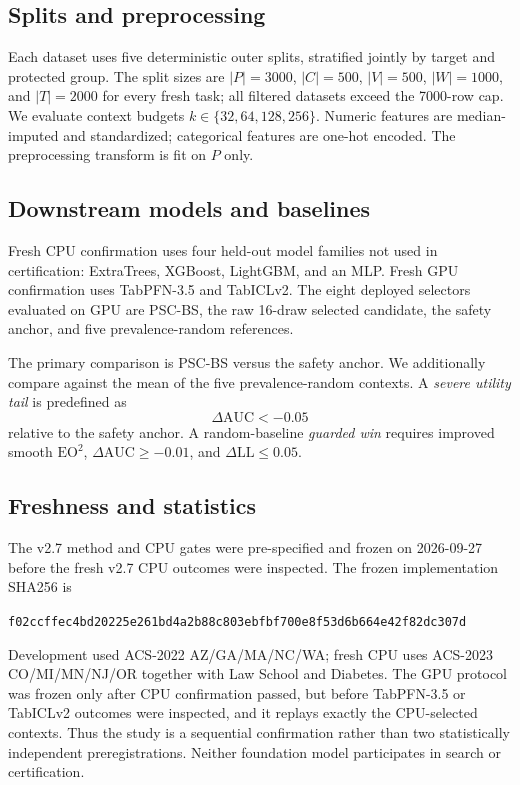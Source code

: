\documentclass[10pt]{article}
\newcommand{\PSC}{\textsc{PSC-BS}}
\newcommand{\eo}{\mathrm{EO}^2}
\newcommand{\AUC}{\mathrm{AUC}}
\newcommand{\LL}{\mathrm{LL}}
\begin{document}
\subsection{Splits and preprocessing}

Each dataset uses five deterministic outer splits, stratified jointly by target and protected group.
The split sizes are $|P|=3000$, $|C|=500$, $|V|=500$, $|W|=1000$, and $|T|=2000$ for every fresh task; all filtered datasets exceed the 7000-row cap.
We evaluate context budgets $k\in\{32,64,128,256\}$.
Numeric features are median-imputed and standardized; categorical features are one-hot encoded.
The preprocessing transform is fit on $P$ only.

\subsection{Downstream models and baselines}

Fresh CPU confirmation uses four held-out model families not used in certification: ExtraTrees, XGBoost, LightGBM, and an MLP.
Fresh GPU confirmation uses TabPFN-3.5 and TabICLv2.
The eight deployed selectors evaluated on GPU are \PSC{}, the raw 16-draw selected candidate, the safety anchor, and five prevalence-random references.

The primary comparison is \PSC{} versus the safety anchor.
We additionally compare against the mean of the five prevalence-random contexts.
A \emph{severe utility tail} is predefined as
\begin{equation}
\Delta\AUC < -0.05
\end{equation}
relative to the safety anchor.
A random-baseline \emph{guarded win} requires improved smooth $\eo$, $\Delta\AUC\ge -0.01$, and $\Delta\LL\le 0.05$.

\subsection{Freshness and statistics}

The v2.7 method and CPU gates were pre-specified and frozen on 2026-09-27 before the fresh v2.7 CPU outcomes were inspected.
The frozen implementation SHA256 is
\begin{center}
\footnotesize\texttt{f02ccffec4bd20225e261bd4a2b88c803ebfbf700e8f53d6b664e42f82dc307d}
\end{center}
Development used ACS-2022 AZ/GA/MA/NC/WA; fresh CPU uses ACS-2023 CO/MI/MN/NJ/OR together with Law School and Diabetes. The GPU protocol was frozen only after CPU confirmation passed, but before TabPFN-3.5 or TabICLv2 outcomes were inspected, and it replays exactly the CPU-selected contexts. Thus the study is a sequential confirmation rather than two statistically independent preregistrations. Neither foundation model participates in search or certification.
\end{document}
